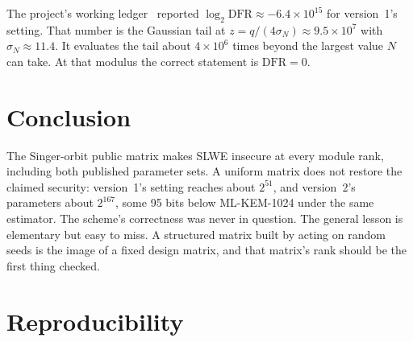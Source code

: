 \documentclass[11pt]{article}
\theoremstyle{remark}
\begin{document}
The project's working ledger~\cite{Led} reported $\log_2\mathrm{DFR}\approx-6.4\times10^{15}$ for version~1's setting.
That number is the Gaussian tail at
$z=q/(4\sigma_N)\approx9.5\times10^{7}$ with $\sigma_N\approx11.4$. It evaluates the tail about $4\times10^{6}$ times
beyond the largest value $N$ can take. At that modulus the correct statement is $\mathrm{DFR}=0$.

\section{Conclusion}

The Singer-orbit public matrix makes SLWE insecure at every module rank, including both published parameter sets. A
uniform matrix does not restore the claimed security: version~1's setting reaches about $2^{51}$, and version~2's
parameters about $2^{167}$, some 95 bits below ML-KEM-1024 under the same estimator. The scheme's correctness
was never in question. The general lesson is
elementary but easy to miss. A structured matrix built by acting on random seeds is the image of a fixed design matrix,
and that matrix's rank should be the first thing checked.

\section{Reproducibility}\label{sec:repro}
\end{document}
